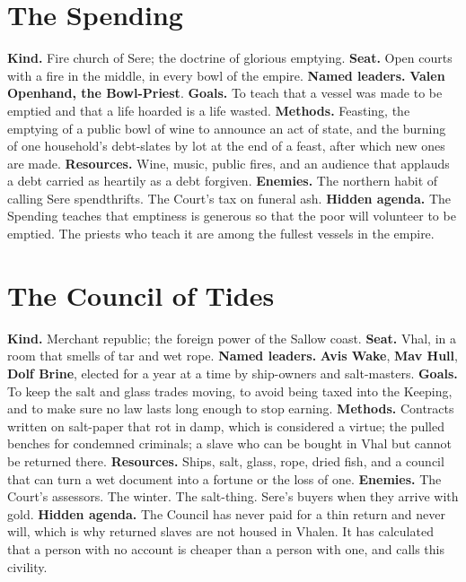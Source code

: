 \documentclass{design/chronicle}
\begin{document}
\section*{The Spending}

\textbf{Kind.} Fire church of Sere; the doctrine of glorious emptying. \textbf{Seat.} Open courts with a fire in the middle, in every bowl of the empire. \textbf{Named leaders.} \textbf{Valen Openhand, the Bowl-Priest}. \textbf{Goals.} To teach that a vessel was made to be emptied and that a life hoarded is a life wasted. \textbf{Methods.} Feasting, the emptying of a public bowl of wine to announce an act of state, and the burning of one household’s debt-slates by lot at the end of a feast, after which new ones are made. \textbf{Resources.} Wine, music, public fires, and an audience that applauds a debt carried as heartily as a debt forgiven. \textbf{Enemies.} The northern habit of calling Sere spendthrifts. The Court’s tax on funeral ash. \textbf{Hidden agenda.} The Spending teaches that emptiness is generous so that the poor will volunteer to be emptied. The priests who teach it are among the fullest vessels in the empire.

\section*{The Council of Tides}

\textbf{Kind.} Merchant republic; the foreign power of the Sallow coast. \textbf{Seat.} Vhal, in a room that smells of tar and wet rope. \textbf{Named leaders.} \textbf{Avis Wake}, \textbf{Mav Hull}, \textbf{Dolf Brine}, elected for a year at a time by ship-owners and salt-masters. \textbf{Goals.} To keep the salt and glass trades moving, to avoid being taxed into the Keeping, and to make sure no law lasts long enough to stop earning. \textbf{Methods.} Contracts written on salt-paper that rot in damp, which is considered a virtue; the pulled benches for condemned criminals; a slave who can be bought in Vhal but cannot be returned there. \textbf{Resources.} Ships, salt, glass, rope, dried fish, and a council that can turn a wet document into a fortune or the loss of one. \textbf{Enemies.} The Court’s assessors. The winter. The salt-thing. Sere’s buyers when they arrive with gold. \textbf{Hidden agenda.} The Council has never paid for a thin return and never will, which is why returned slaves are not housed in Vhalen. It has calculated that a person with no account is cheaper than a person with one, and calls this civility.
\end{document}
